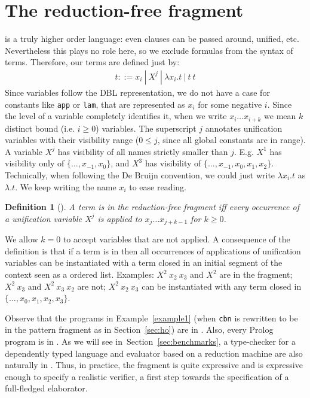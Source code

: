 \documentclass{llncs}
\newtheorem{mydef}{Definition}
\begin{document}
\section{The reduction-free fragment \rff{}}\label{sec:fragment}
\lp{} is a truly higher order language: even clauses can be
passed around, unified, etc. Nevertheless this plays no role here, so
we exclude formulas from the syntax of terms.
Therefore, our terms are defined just by:
\vspace{-0.5em}
$$\begin{array}{l}
   t ::= x_i ~|~ X^j ~|~ \lambda x_i.t ~|~ t~t
\end{array}$$
\vspace{-0.1em}
Since variables follow the DBL representation, we do not have a case
for constants like \verb+app+ or \verb+lam+, that are represented as $x_i$ for some negative $i$.
Since the
level of a variable completely identifies it, when we write
$x_i \ldots x_{i+k}$ we mean $k$ distinct bound (i.e. $i \geq 0$) variables.
The superscript $j$ annotates unification variables with their
visibility range ($0 \leq j$, since all global constants are in range).
A variable $X^j$ has visibility of all names strictly
smaller than $j$. E.g. $X^1$ has visibility only of $\{\ldots,x_{-1},x_0\}$, and $X^3$ has
visibility of $\{\ldots,x_{-1},x_0,x_1,x_2\}$. Technically, when following
the De Bruijn convention, we could just write $\lambda x_i.t$ as $\lambda.t$.
We keep writing the name $x_i$ to ease reading.

\begin{mydef}[\rff{}]
A term is in the reduction-free fragment \rff{} iff
every occurrence of a unification variable $X^j$ is applied to
$x_j \ldots x_{j+k-1}$ for $k \ge 0$.
\end{mydef}

We allow $k=0$ to accept variables that are not applied. A consequence of
the definition is that if a term is in \rff{} then all occurrences of
applications of unification variables
can be instantiated with a term closed
in an initial segment of the \lp{} context seen as a ordered list.
Examples: $X^2~x_2~x_3$ and $X^2$ are in the fragment; $X^2~x_3$ and
$X^2~x_3~x_2$ are not; $X^2~x_2~x_3$ can be instantiated with any term
closed in $\{\ldots,x_0,x_1,x_2,x_3\}$.

Observe that the programs in Example~\ref{example1} (when \verb+cbn+ is
rewritten to be in the pattern fragment as in Section~\ref{sec:ho}) are in
\rff{}. Also, every Prolog program is in \rff{}. As we will see
in~Section~\ref{sec:benchmarks}, a
type-checker for a dependently typed language
and evaluator based on a reduction machine are also naturally in \rff{}.
Thus, in practice, the fragment is quite expressive
and is expressive enough to specify a realistic verifier,
a first step towards the specification of a full-fledged elaborator.
\end{document}
